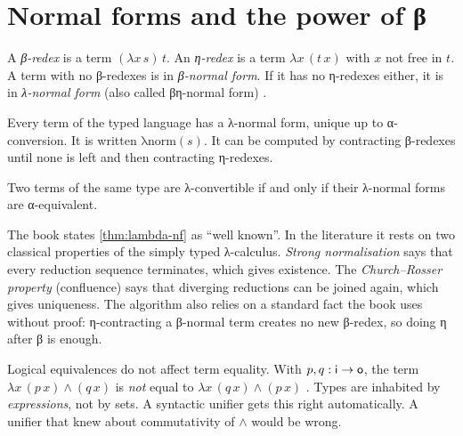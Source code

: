 \section{Normal forms and the power of β}\label{sec:lambda-normal}

A \emph{β-redex} is a term $(\lambda x\,s)\,t$. An \emph{η-redex} is a term $\lambda x\,(t\,x)$ with $x$
not free in $t$. A term with no β-redexes is in \emph{β-normal form}. If it has no η-redexes either, it
is in \emph{λ-normal form} (also called βη-normal form) .

\begin{theorem}\label{thm:lambda-nf}
Every term of the typed language has a λ-normal form, unique up to α-conversion. It is written
$\mathrm{λnorm}(s)$. It can be computed by contracting β-redexes until none is left and then
contracting η-redexes.
\end{theorem}

\begin{corollary}\label{cor:lambda-eq}
Two terms of the same type are λ-convertible if and only if their λ-normal forms are α-equivalent.
\end{corollary}

\begin{remark}
The book states \cref{thm:lambda-nf} as \enquote{well known}. In the literature it rests on two
classical properties of the simply typed λ-calculus. \emph{Strong normalisation} says that every
reduction sequence terminates, which gives existence. The \emph{Church–Rosser property} (confluence)
says that diverging reductions can be joined again, which gives uniqueness. The algorithm also
relies on a standard fact the book uses without proof: η-contracting a β-normal term creates no new
β-redex, so doing η after β is enough.
\end{remark}

\begin{pitfall}
Logical equivalences do not affect term equality. With $p,q:\mathsf{i}\to\mathsf{o}$, the term
$\lambda x\,(p\,x)\wedge(q\,x)$ is \emph{not} equal to $\lambda x\,(q\,x)\wedge(p\,x)$ . Types
are inhabited by \emph{expressions}, not by sets. A syntactic unifier gets this right automatically. A
unifier that knew about commutativity of $\wedge$ would be wrong.
\end{pitfall}

